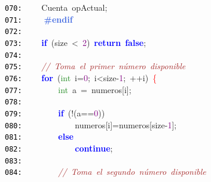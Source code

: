 \documentclass[a4paper,10pt]{scrartcl}
\begin{document}
{   \mbox{}\texttt{\textcolor{Black}{070:}} \ \ \ \ \textcolor{TealBlue}{Cuenta}\ opActual\textcolor{BrickRed}{;} \\
   \mbox{}\texttt{\textcolor{Black}{071:}} \textbf{\textcolor{RoyalBlue}{\ \ \ \ \#endif}} \\
   \mbox{}\texttt{\textcolor{Black}{072:}} \ \  \\
   \mbox{}\texttt{\textcolor{Black}{073:}} \ \ \ \ \textbf{\textcolor{Blue}{if}}\ \textcolor{BrickRed}{(}size\ \textcolor{BrickRed}{\textless{}}\ \textcolor{Purple}{2}\textcolor{BrickRed}{)}\ \textbf{\textcolor{Blue}{return}}\ \textbf{\textcolor{Blue}{false}}\textcolor{BrickRed}{;} \\
   \mbox{}\texttt{\textcolor{Black}{074:}} \ \  \\
   \mbox{}\texttt{\textcolor{Black}{075:}} \ \ \ \ \textit{\textcolor{Brown}{//\ Toma\ el\ primer\ número\ disponible}} \\
   \mbox{}\texttt{\textcolor{Black}{076:}} \ \ \ \ \textbf{\textcolor{Blue}{for}}\ \textcolor{BrickRed}{(}\textcolor{ForestGreen}{int}\ i\textcolor{BrickRed}{=}\textcolor{Purple}{0}\textcolor{BrickRed}{;}\ i\textcolor{BrickRed}{\textless{}}size\textcolor{BrickRed}{-}\textcolor{Purple}{1}\textcolor{BrickRed}{;}\ \textcolor{BrickRed}{++}i\textcolor{BrickRed}{)}\ \textcolor{Red}{\{} \\
   \mbox{}\texttt{\textcolor{Black}{077:}} \ \ \ \ \ \ \ \ \textcolor{ForestGreen}{int}\ a\ \textcolor{BrickRed}{=}\ numeros\textcolor{BrickRed}{[}i\textcolor{BrickRed}{];} \\
   \mbox{}\texttt{\textcolor{Black}{078:}} \ \ \ \  \\
   \mbox{}\texttt{\textcolor{Black}{079:}} \ \ \ \ \ \ \ \ \textbf{\textcolor{Blue}{if}}\ \textcolor{BrickRed}{(!(}a\textcolor{BrickRed}{==}\textcolor{Purple}{0}\textcolor{BrickRed}{))} \\
   \mbox{}\texttt{\textcolor{Black}{080:}} \ \ \ \ \ \ \ \ \ \ \ \ numeros\textcolor{BrickRed}{[}i\textcolor{BrickRed}{]=}numeros\textcolor{BrickRed}{[}size\textcolor{BrickRed}{-}\textcolor{Purple}{1}\textcolor{BrickRed}{];} \\
   \mbox{}\texttt{\textcolor{Black}{081:}} \ \ \ \ \ \ \ \ \textbf{\textcolor{Blue}{else}} \\
   \mbox{}\texttt{\textcolor{Black}{082:}} \ \ \ \ \ \ \ \ \ \ \ \ \textbf{\textcolor{Blue}{continue}}\textcolor{BrickRed}{;} \\
   \mbox{}\texttt{\textcolor{Black}{083:}} \ \ \ \  \\
   \mbox{}\texttt{\textcolor{Black}{084:}} \ \ \ \ \ \ \ \ \textit{\textcolor{Brown}{//\ Toma\ el\ segundo\ número\ disponible}} \\
}
\end{document}
